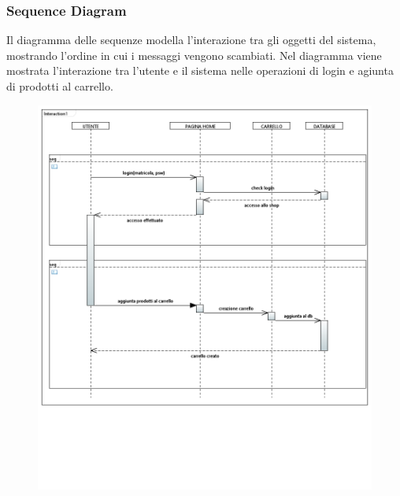 \documentclass[a4paper,12pt]{article}
\begin{document}
\subsubsection{Sequence Diagram}
Il diagramma delle sequenze modella l'interazione tra gli oggetti del sistema, mostrando l'ordine in cui i messaggi vengono scambiati. Nel diagramma viene mostrata l'interazione tra l'utente e il sistema nelle operazioni di login e agiunta di prodotti al carrello.
\begin{figure}[H]
    \centering
    \includegraphics[width=1\textwidth]{../UML/UML png/Sequence_Diagram.png}
    \label{fig:Sequence Diagram}
\end{figure}
\end{document}
